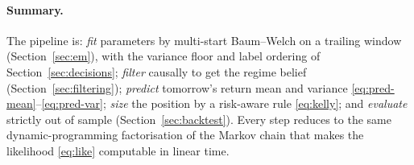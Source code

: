 \documentclass[11pt]{article}
\theoremstyle{plain}
\theoremstyle{definition}
\theoremstyle{remark}
\begin{document}
\paragraph{Summary.} The pipeline is: \emph{fit} parameters by multi-start
Baum--Welch on a trailing window (Section~\ref{sec:em}), with the variance floor
and label ordering of Section~\ref{sec:decisions}; \emph{filter} causally to get
the regime belief (Section~\ref{sec:filtering}); \emph{predict} tomorrow's return
mean and variance \eqref{eq:pred-mean}--\eqref{eq:pred-var}; \emph{size} the
position by a risk-aware rule \eqref{eq:kelly}; and \emph{evaluate} strictly out
of sample (Section~\ref{sec:backtest}). Every step reduces to the same
dynamic-programming factorisation of the Markov chain that makes the likelihood
\eqref{eq:like} computable in linear time.
\end{document}
